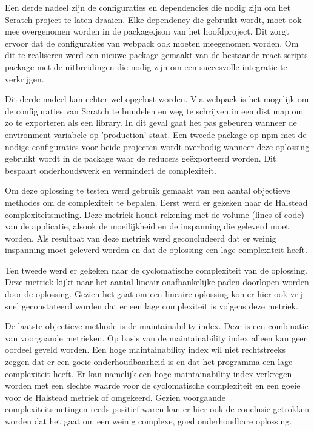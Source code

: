 Een derde nadeel zijn de configuraties en dependencies die nodig zijn om het Scratch project te laten draaien. 
Elke dependency die gebruikt wordt, moet ook mee overgenomen worden in de package.json van het hoofdproject. Dit zorgt ervoor dat de configuraties van webpack ook moeten meegenomen worden. Om dit te realiseren werd een nieuwe package gemaakt van de bestaande react-scripts package met de uitbreidingen die nodig zijn om een succesvolle integratie te verkrijgen.

Dit derde nadeel kan echter wel opgelost worden. Via webpack is het mogelijk om de configuraties van Scratch te bundelen en weg te schrijven in een dist map om zo te exporteren als een library. In dit geval gaat het pas gebeuren wanneer de environment variabele op 'production' staat. Een tweede package op npm met de nodige configuraties voor beide projecten wordt overbodig wanneer deze oplossing gebruikt wordt in de package waar de reducers geëxporteerd worden. Dit bespaart onderhoudswerk en vermindert de complexiteit.

Om deze oplossing te testen werd gebruik gemaakt van een aantal objectieve methodes om de complexiteit te bepalen. Eerst werd er gekeken naar de Halstead complexiteitsmeting. Deze metriek houdt rekening met de volume (lines of code) van de applicatie, alsook de moeilijkheid en de inspanning die geleverd moet worden. Als resultaat van deze metriek werd geconcludeerd dat er weinig inspanning moet geleverd worden en dat de oplossing een lage complexiteit heeft. 

Ten tweede werd er gekeken naar de cyclomatische complexiteit van de oplossing. Deze metriek kijkt naar het aantal lineair onafhankelijke paden doorlopen worden door de oplossing. Gezien het gaat om een lineaire oplossing kon er hier ook vrij snel geconstateerd worden dat er een lage complexiteit is volgens deze metriek. 

De laatste objectieve methode is de maintainability index. Deze is een combinatie van voorgaande metrieken. Op basis van de maintainability index alleen kan geen oordeel geveld worden. Een hoge maintainability index wil niet rechtstreeks zeggen dat er een goeie onderhoudbaarheid is en dat het programma een lage complexiteit heeft. Er kan namelijk een hoge maintainability index verkregen worden met een slechte waarde voor de cyclomatische complexiteit en een goeie voor de Halstead metriek of omgekeerd. Gezien voorgaande complexiteitsmetingen reeds positief waren kan er hier ook de conclusie getrokken worden dat het gaat om een weinig complexe, goed onderhoudbare oplossing.


